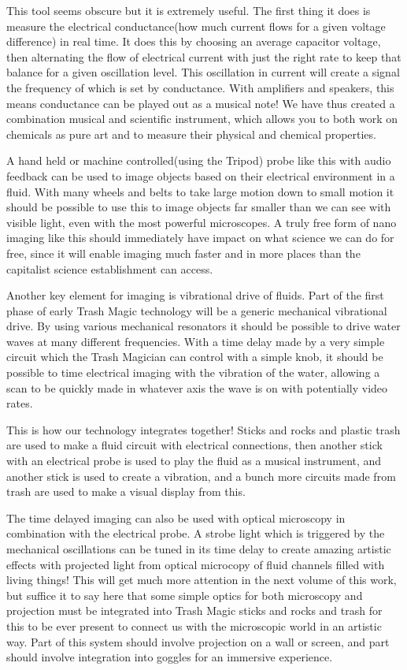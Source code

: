 This tool seems obscure but it is extremely useful. The first thing it
does is measure the electrical conductance(how much current flows for a
given voltage difference) in real time. It does this by choosing an
average capacitor voltage, then alternating the flow of electrical
current with just the right rate to keep that balance for a given
oscillation level. This oscillation in current will create a signal the
frequency of which is set by conductance. With amplifiers and speakers,
this means conductance can be played out as a musical note! We have thus
created a combination musical and scientific instrument, which allows
you to both work on chemicals as pure art and to measure their physical
and chemical properties.

A hand held or machine controlled(using the Tripod) probe like this with
audio feedback can be used to image objects based on their electrical
environment in a fluid. With many wheels and belts to take large motion
down to small motion it should be possible to use this to image objects
far smaller than we can see with visible light, even with the most
powerful microscopes. A truly free form of nano imaging like this should
immediately have impact on what science we can do for free, since it
will enable imaging much faster and in more places than the capitalist
science establishment can access.

Another key element for imaging is vibrational drive of fluids. Part of
the first phase of early Trash Magic technology will be a generic
mechanical vibrational drive. By using various mechanical resonators it
should be possible to drive water waves at many different frequencies.
With a time delay made by a very simple circuit which the Trash Magician
can control with a simple knob, it should be possible to time electrical
imaging with the vibration of the water, allowing a scan to be quickly
made in whatever axis the wave is on with potentially video rates.

This is how our technology integrates together! Sticks and rocks and
plastic trash are used to make a fluid circuit with electrical
connections, then another stick with an electrical probe is used to play
the fluid as a musical instrument, and another stick is used to create a
vibration, and a bunch more circuits made from trash are used to make a
visual display from this.

The time delayed imaging can also be used with optical microscopy in
combination with the electrical probe. A strobe light which is triggered
by the mechanical oscillations can be tuned in its time delay to create
amazing artistic effects with projected light from optical microcopy of
fluid channels filled with living things! This will get much more
attention in the next volume of this work, but suffice it to say here
that some simple optics for both microscopy and projection must be
integrated into Trash Magic sticks and rocks and trash for this to be
ever present to connect us with the microscopic world in an artistic
way. Part of this system should involve projection on a wall or screen,
and part should involve integration into goggles for an immersive
experience.

